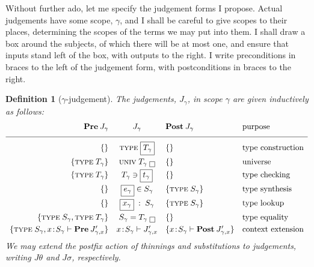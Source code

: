 \documentclass{jfp1}
\newtheorem{definition}[theorem]{Definition}
\begin{document}
Without further ado, let me specify the judgement forms I
propose. Actual judgements have some scope, $\gamma$, and I shall be
careful to give scopes to their places, determining the scopes of the
terms we may put into them. I shall draw a box around the
subjects, of which there will be at most one, and ensure that inputs
stand left of the box, with outputs to the right.  I write
preconditions in braces to the left of the judgement form, with
postconditions in braces to the right.

\newcommand{\bx}[1]{\framebox{\ensuremath{#1}}}
\newcommand{\ty}[1]{\textsc{type}\;#1}
\newcommand{\univ}[1]{\textsc{univ}\;#1}
\newcommand{\chk}[2]{#1 \ni #2}
\newcommand{\syn}[2]{#1 \in #2}
\newcommand{\cxe}[2]{#1\!:\!#2\vdash}
\newcommand{\cxl}[2]{#1\;:\;#2}
\newcommand{\Pre}[1]{\textbf{Pre}\:#1}
\newcommand{\Post}[1]{\textbf{Post}\:#1}
\begin{definition}[$\gamma$-judgement\label{def:judgement}]
  The judgements, $J_\gamma$, in scope $\gamma$ are given inductively as follows:
  \[\begin{array}{r@{\quad}c@{\quad}l@{\quad}l}
      \Pre{J_\gamma} & J_\gamma& \Post{J_\gamma} & \mbox{purpose} \\
      \hline
      \{\} &\ty{\bx{T_\gamma}}& \{\}  & \mbox{type construction}
                                        \smallskip\\
      \{\ty{T_\gamma}\} &\univ{T_\gamma}\;\bx{}& \{\}  & \mbox{universe}
                                        \smallskip\\
      \{\ty{T_\gamma}\} & \chk{T_\gamma}{\bx{t_\gamma}} &\{\}  & \mbox{type checking}
                                                                 \smallskip\\
      \{\}  & \syn{\bx{e_\gamma}}{S_\gamma} & \{\ty{S_\gamma}\} & \mbox{type synthesis}
                                                                  \smallskip\\
      \{\}  & \cxl{\bx{x_\gamma}}{S_\gamma} & \{\ty{S_\gamma}\} & \mbox{type lookup}
                                                             \smallskip\\
      \{\ty{S_\gamma},\ty{T_\gamma}\} & S_\gamma = T_\gamma\;\bx{} & \{\}  & \mbox{type equality}
                                                                             \smallskip\\
      \{\ty{S_\gamma},\cxe x{S_\gamma} \Pre{J'_{\gamma,x}}\} & \cxe x{S_\gamma} J'_{\gamma,x}
           & \{\cxe x{S_\gamma}\Post{J'_{\gamma,x}}\} & \mbox{context extension} 
    \end{array}\]
  We may extend the postfix action of thinnings and substitutions to
  judgements, writing $J\theta$ and $J\sigma$, respectively.
\end{definition}
\end{document}

